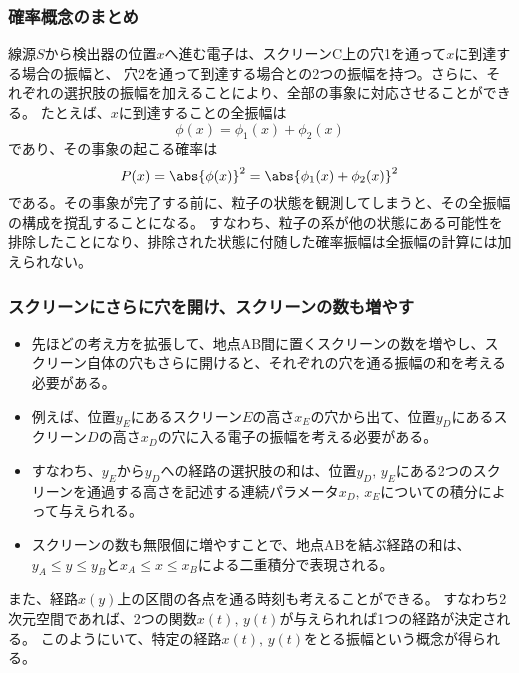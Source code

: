 \documentclass[10pt,aspectratio=169,xcolor=dvipsnames,table,dvipdfmx]{beamer}
\begin{document}
\begin{frame}
  \frametitle{確率概念のまとめ}
  線源$S$から検出器の位置$x$へ進む電子は、スクリーンC上の穴1を通って$x$に到達する場合の振幅と、
  穴2を通って到達する場合との2つの振幅を持つ。さらに、それぞれの選択肢の振幅を加えることにより、全部の事象に対応させることができる。
  たとえば、$x$に到達することの全振幅は
  \begin{equation}
    \phi(x) = \phi_1(x) + \phi_2(x)
  \end{equation}
  であり、その事象の起こる確率は
  \begin{equation}
    P(x) = \abs{\phi(x)}^2 = \abs{\phi_1(x)+\phi_2(x)}^2
  \end{equation}
  である。その事象が完了する前に、粒子の状態を観測してしまうと、その全振幅の構成を撹乱することになる。
  すなわち、粒子の系が他の状態にある可能性を排除したことになり、排除された状態に付随した確率振幅は全振幅の計算には加えられない。
\end{frame}
\begin{frame}
  \frametitle{スクリーンにさらに穴を開け、スクリーンの数も増やす}
  \begin{itemize}
    \item 先ほどの考え方を拡張して、地点AB間に置くスクリーンの数を増やし、スクリーン自体の穴もさらに開けると、それぞれの穴を通る振幅の和を考える必要がある。
    \item 例えば、位置$y_E$にあるスクリーン$E$の高さ$x_E$の穴から出て、位置$y_D$にあるスクリーン$D$の高さ$x_D$の穴に入る電子の振幅を考える必要がある。
    \item すなわち、$y_E$から$y_D$への経路の選択肢の和は、位置$y_D,\,y_E$にある2つのスクリーンを通過する高さを記述する連続パラメータ$x_D,\,x_E$についての積分によって与えられる。
    \item スクリーンの数も無限個に増やすことで、地点ABを結ぶ経路の和は、$y_A\leq y\leq y_B$と$x_A\leq x\leq x_B$による二重積分で表現される。
  \end{itemize}
  また、経路$x(y)$上の区間の各点を通る時刻も考えることができる。
  すなわち2次元空間であれば、2つの関数$x(t),\,y(t)$が与えられれば1つの経路が決定される。
  このようにいて、特定の経路$x(t),\,y(t)$をとる振幅という概念が得られる。
\end{frame}

\end{document}
